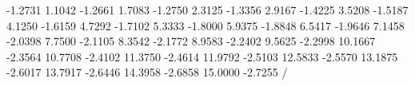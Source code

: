   -1.2731
    1.1042   -1.2661
    1.7083   -1.2750
    2.3125   -1.3356
    2.9167   -1.4225
    3.5208   -1.5187
    4.1250   -1.6159
    4.7292   -1.7102
    5.3333   -1.8000
    5.9375   -1.8848
    6.5417   -1.9646
    7.1458   -2.0398
    7.7500   -2.1105
    8.3542   -2.1772
    8.9583   -2.2402
    9.5625   -2.2998
   10.1667   -2.3564
   10.7708   -2.4102
   11.3750   -2.4614
   11.9792   -2.5103
   12.5833   -2.5570
   13.1875   -2.6017
   13.7917   -2.6446
   14.3958   -2.6858
   15.0000   -2.7255
/\relax
